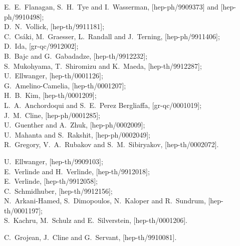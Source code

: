 \documentclass[a4paper,12pt]{article}
\begin{document}
\begin{thebibliography}{99}
%
E.~E.~Flanagan, S.~H.~Tye and I.~Wasserman,
[hep-ph/9909373]
and
[hep-ph/9910498];\\
%
%
D.~N.~Vollick,
[hep-th/9911181];\\
%
C.~Cs\'aki, M.~Graesser, L.~Randall and J.~Terning,
[hep-ph/9911406];\\
%
D.~Ida,
[gr-qc/9912002];\\
%
B.~Bajc and G.~Gabadadze,
[hep-th/9912232];\\
%
S.~Mukohyama, T.~Shiromizu and K.~Maeda,
[hep-th/9912287];\\
%
U.~Ellwanger,
[hep-th/0001126];\\
%
G.~Amelino-Camelia,
[hep-th/0001207];\\
%
H.~B.~Kim,
[hep-th/0001209];\\
%
L.~A.~Anchordoqui and S.~E.~Perez Bergliaffa,
[gr-qc/0001019];\\
%
J.~M.~Cline,
[hep-ph/0001285];\\
%
U.~Guenther and A.~Zhuk,
[hep-ph/0002009];\\
%
U.~Mahanta and S.~Rakshit,
[hep-ph/0002049];\\
%
R.~Gregory, V.~A.~Rubakov and S.~M.~Sibiryakov,
[hep-th/0002072].






U.~Ellwanger,
[hep-th/9909103];\\
%
E.~Verlinde and H.~Verlinde,
[hep-th/9912018];\\
%
E.~Verlinde,
[hep-th/9912058];\\
%
C.~Schmidhuber,
[hep-th/9912156];\\
%
N.~Arkani-Hamed, S.~Dimopoulos, N.~Kaloper and R.~Sundrum,
[hep-th/0001197];\\
%
S.~Kachru, M.~Schulz and E.~Silverstein,
[hep-th/0001206].

C.~Grojean, J.~Cline and G.~Servant,
[hep-th/9910081].






\end{thebibliography}
\end{document}
